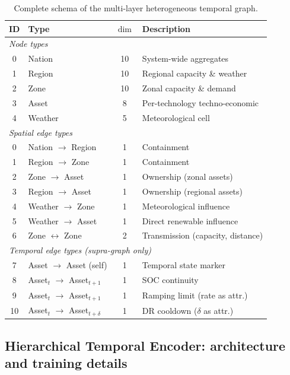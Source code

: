 \documentclass{article}
\begin{document}
\begin{table}[htbp]
\centering
\small
\begin{tabular}{clcl}
\toprule
\textbf{ID} & \textbf{Type} & \textbf{$\dim$} & \textbf{Description} \\
\midrule
\multicolumn{4}{l}{\textit{Node types}} \\
0 & Nation & 10 & System-wide aggregates \\
1 & Region & 10 & Regional capacity \& weather \\
2 & Zone & 10 & Zonal capacity \& demand \\
3 & Asset & 8 & Per-technology techno-economic \\
4 & Weather & 5 & Meteorological cell \\
\midrule
\multicolumn{4}{l}{\textit{Spatial edge types}} \\
0 & Nation $\to$ Region & 1 & Containment \\
1 & Region $\to$ Zone & 1 & Containment \\
2 & Zone $\to$ Asset & 1 & Ownership (zonal assets) \\
3 & Region $\to$ Asset & 1 & Ownership (regional assets) \\
4 & Weather $\to$ Zone & 1 & Meteorological influence \\
5 & Weather $\to$ Asset & 1 & Direct renewable influence \\
6 & Zone $\leftrightarrow$ Zone & 2 & Transmission (capacity, distance) \\
\midrule
\multicolumn{4}{l}{\textit{Temporal edge types (supra-graph only)}} \\
7 & Asset $\to$ Asset (self) & 1 & Temporal state marker \\
8 & Asset$_t$ $\to$ Asset$_{t+1}$ & 1 & SOC continuity \\
9 & Asset$_t$ $\to$ Asset$_{t+1}$ & 1 & Ramping limit (rate as attr.) \\
10 & Asset$_t$ $\to$ Asset$_{t+\delta}$ & 1 & DR cooldown ($\delta$ as attr.) \\
\bottomrule
\end{tabular}
\caption{Complete schema of the multi-layer heterogeneous temporal graph.}
\label{tab:graph_schema}
\end{table}


\subsection{Hierarchical Temporal Encoder: architecture and training details}
\label{app:hte_details}
\end{document}
